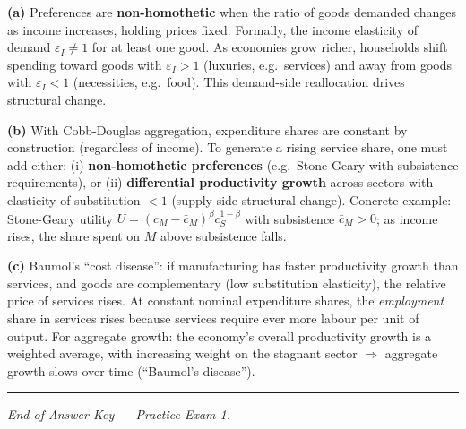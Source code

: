 \documentclass[a4paper,11pt]{article}
\begin{document}
\begin{answerbox}
\textbf{(a)} Preferences are \textbf{non-homothetic} when the ratio of goods demanded
changes as income increases, holding prices fixed.  Formally, the income elasticity of
demand $\varepsilon_I \neq 1$ for at least one good.  As economies grow richer,
households shift spending toward goods with $\varepsilon_I > 1$ (luxuries, e.g.\
services) and away from goods with $\varepsilon_I < 1$ (necessities, e.g.\ food).
This demand-side reallocation drives structural change.

\textbf{(b)} With Cobb-Douglas aggregation, expenditure shares are constant by
construction (regardless of income).  To generate a rising service share, one must add
either: (i) \textbf{non-homothetic preferences} (e.g.\ Stone-Geary with subsistence
requirements), or (ii) \textbf{differential productivity growth} across sectors with
elasticity of substitution $<1$ (supply-side structural change).  Concrete example:
Stone-Geary utility $U = (c_M - \bar{c}_M)^{\beta}c_S^{1-\beta}$ with subsistence
$\bar{c}_M > 0$; as income rises, the share spent on $M$ above subsistence falls.

\textbf{(c)} Baumol's ``cost disease'': if manufacturing has faster productivity growth
than services, and goods are complementary (low substitution elasticity), the relative
price of services rises.  At constant nominal expenditure shares, the \emph{employment}
share in services rises because services require ever more labour per unit of output.
For aggregate growth: the economy's overall productivity growth is a weighted average,
with increasing weight on the stagnant sector $\Rightarrow$ aggregate growth slows over
time (``Baumol's disease'').
\end{answerbox}

\vspace{12pt}
\noindent\rule{\textwidth}{0.4pt}
\begin{center}\textit{End of Answer Key --- Practice Exam 1.}\end{center}
\end{document}
